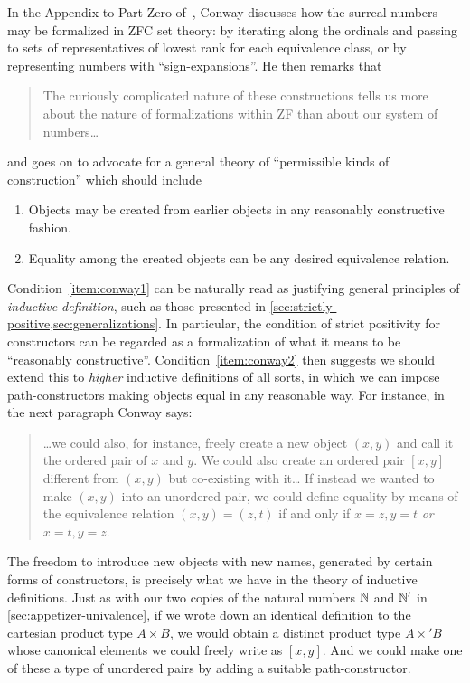In the Appendix to Part Zero of~\cite{conway:onag}, Conway discusses how the surreal numbers may be formalized in ZFC set theory: by iterating along the ordinals and passing to sets of representatives of lowest rank for each equivalence class, or by representing numbers with ``sign-expansions''.
He then remarks that
\begin{quote}\footnotesize
  The curiously complicated nature of these constructions tells us more about the nature of formalizations within ZF than about our system of numbers\dots
\end{quote}
and goes on to advocate for a general theory of ``permissible kinds of construction'' which should include
\begin{enumerate}\footnotesize
\item Objects may be created from earlier objects in any reasonably constructive fashion.\label{item:conway1}
\item Equality among the created objects can be any desired equivalence relation.\label{item:conway2}
\end{enumerate}
\noindent
Condition~\ref{item:conway1} can be naturally read as justifying general principles of \emph{inductive definition}, such as those presented in \autoref{sec:strictly-positive,sec:generalizations}.
In particular, the condition of strict positivity for constructors can be regarded as a formalization of what it means to be ``reasonably constructive''.
Condition~\ref{item:conway2} then suggests we should extend this to \emph{higher} inductive definitions of all sorts, in which we can impose path-constructors making objects equal in any reasonable way.
For instance, in the next paragraph Conway says:
\begin{quote}\footnotesize
  \dots we could also, for instance, freely create a new object $(x,y)$ and call it the ordered pair of $x$ and $y$.
  We could also create an ordered pair $[x,y]$ different from $(x,y)$ but co-existing with it\dots
  If instead we wanted to make $(x,y)$ into an unordered pair, we could define equality by means of the equivalence relation $(x,y)=(z,t)$ if and only if $x=z,y=t$ \emph{or} $x=t,y=z$.
\end{quote}
The freedom to introduce new objects with new names, generated by certain forms of constructors, is precisely what we have in the theory of inductive definitions.
Just as with our two copies of the natural numbers $\mathbb{N}$ and $\mathbb{N}'$ in \autoref{sec:appetizer-univalence}, if we wrote down an identical definition to the cartesian product type $A\times B$, we would obtain a distinct product type $A\times' B$ whose canonical elements we could freely write as $[x,y]$.
And we could make one of these a type of unordered pairs by adding a suitable path-constructor. %

